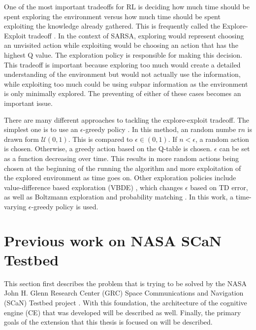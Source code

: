 	\par One of the most important tradeoffs for RL is deciding how much time should be spent exploring the environment versus how much time should be spent exploiting the knowledge already gathered. This is frequently called the Explore-Exploit tradeoff \cite{bubeck2012regret}. In the context of SARSA, exploring would represent choosing an unvisited action while exploiting would be choosing an action that has the highest Q value. The exploration policy is responsible for making this decision. This tradeoff is important because exploring too much would create a detailed understanding of the environment but would not actually use the information, while exploiting too much could be using subpar information as the environment is only minimally explored. The preventing of either of these cases becomes an important issue. 
	\par There are many different approaches to tackling the explore-exploit tradeoff. The simplest one is to use an $\epsilon$-greedy policy \cite{bubeck2012regret}. In this method, an  random numbe r$n$ is drawn form $\mathcal{U}(0,1)$. This is compared to $\epsilon \in (0,1)$. If $n<\epsilon$, a random action is chosen. Otherwise, a greedy action based on the Q-table is chosen. $\epsilon$ can be set as a function decreasing over time. This results in more random actions being chosen at the beginning of the running the algorithm and more exploitation of the explored environment as time goes on. Other exploration policies include value-difference based exploration (VBDE) \cite{tokic2010adaptive}, which changes $\epsilon$ based on TD error, as well as Boltzmann exploration and probability matching \cite{Sutton1990IntegratedAF}. In this work, a time-varying $\epsilon$-greedy policy is used. 
	\section{Previous work on NASA SCaN Testbed}
	\par This section first describes the problem that is trying to be solved by the NASA John H. Glenn Research Center (GRC) Space Communications and Navigation (SCaN) Testbed project \cite{reinhart2014space}. With this foundation, the architecture of the cognitive engine (CE) that was developed will be described as well. Finally, the primary goals of the extension that this thesis is focused on will be described.
